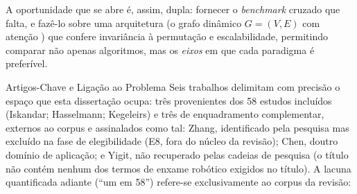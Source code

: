 \documentclass[12pt,reqno, twoside]{amsbook}
\makeatletter
\def\section{\@startsection{section}{1}%
      \z@{.5\linespacing\@plus.7\linespacing}{.25\linespacing}%
      {\normalfont\bfseries\flushleft}}
\theoremstyle{plain}
\numberwithin{equation}{chapter}
\numberwithin{section}{chapter}
\numberwithin{table}{chapter}
\numberwithin{figure}{chapter}
\makeatother
\begin{document}
A oportunidade que se abre é, assim, dupla: fornecer o \textit{benchmark} cruzado que falta, e fazê-lo sobre uma arquitetura (o grafo dinâmico $G=(V,E)$ com atenção \cite{chen2024graph, velickovic2018gat}) que confere invariância à permutação e escalabilidade, permitindo comparar não apenas algoritmos, mas os \emph{eixos} em que cada paradigma é preferível.

\section{Artigos-Chave e Ligação ao Problema}
Seis trabalhos delimitam com precisão o espaço que esta dissertação ocupa: três provenientes dos 58 estudos incluídos (Iskandar; Hasselmann; Kegeleirs) e três de enquadramento complementar, externos ao corpus e assinalados como tal: Zhang, identificado pela pesquisa mas excluído na fase de elegibilidade (E8, fora do núcleo da revisão); Chen, doutro domínio de aplicação; e Yigit, não recuperado pelas cadeias de pesquisa (o título não contém nenhum dos termos de enxame robótico exigidos no título). A lacuna quantificada adiante (``um em 58'') refere-se exclusivamente ao corpus da revisão:
\end{document}
